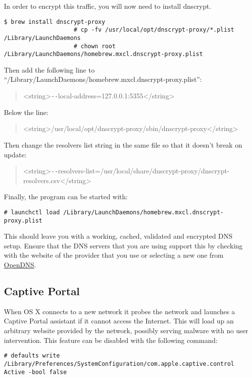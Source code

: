 				In order to encrypt this traffic, you will now need to install dnscrypt.
				\begin{lstlisting}[style=CLI]
					$ brew install dnscrypt-proxy
					# cp -fv /usr/local/opt/dnscrypt-proxy/*.plist /Library/LaunchDaemons
					# chown root /Library/LaunchDaemons/homebrew.mxcl.dnscrypt-proxy.plist
				\end{lstlisting}
				Then add the following line to ``/Library/LaunchDaemons/homebrew.mxcl.dnscrypt-proxy.plist'':
				\begin{quote}
					<string>\verb+--+local-address=127.0.0.1:5355</string>
				\end{quote}
				Below the line:
				\begin{quote}
					<string>/usr/local/opt/dnscrypt-proxy/sbin/dnscrypt-proxy</string>
				\end{quote}
				Then change the resolvers list string in the same file so that it doesn't break on update:
				\begin{quote}
					<string>\verb+--+resolvers-list=/usr/local/share/dnscrypt-proxy/dnscrypt-resolvers.csv</string>
				\end{quote}
				Finally, the program can be started with:
				\begin{lstlisting}[style=CLI]
					# launchctl load /Library/LaunchDaemons/homebrew.mxcl.dnscrypt-proxy.plist
				\end{lstlisting}

				This should leave you with a working, cached, validated and encrypted DNS setup.
				Ensure that the DNS servers that you are using support this by checking with the website of the provider that you use or
				selecting a new one from \href{https://www.opendns.com/}{OpenDNS}.

			\subsection{Captive Portal}
				When OS X connects to a new network it probes the network and launches a Captive Portal assistant if it cannot access the Internet.
				This will load up an arbitrary website provided by the network, possibly serving malware with no user intervention.
				This feature can be disabled with the following command:
				\begin{lstlisting}[style=CLI]
					# defaults write /Library/Preferences/SystemConfiguration/com.apple.captive.control Active -bool false
				\end{lstlisting}

